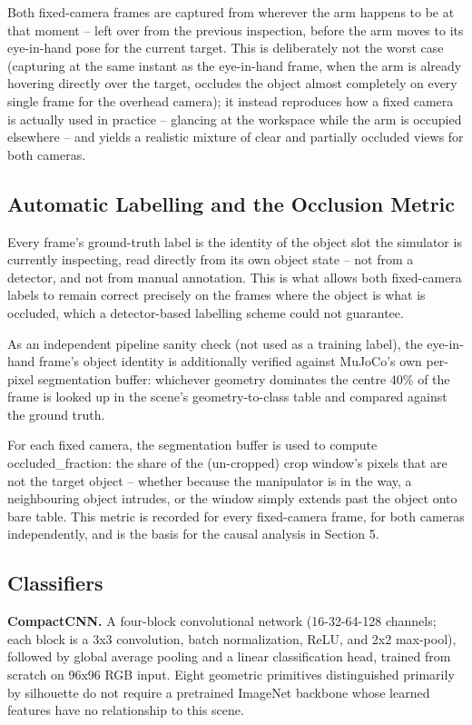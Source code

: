 \documentclass[conference]{IEEEtran}
\begin{document}
Both fixed-camera frames are captured from wherever the arm happens to be at that moment -- left over from the previous inspection, before the arm moves to its eye-in-hand pose for the current target. This is deliberately not the worst case (capturing at the same instant as the eye-in-hand frame, when the arm is already hovering directly over the target, occludes the object almost completely on every single frame for the overhead camera); it instead reproduces how a fixed camera is actually used in practice -- glancing at the workspace while the arm is occupied elsewhere -- and yields a realistic mixture of clear and partially occluded views for both cameras.

\subsection{Automatic Labelling and the Occlusion Metric}

Every frame's ground-truth label is the identity of the object slot the simulator is currently inspecting, read directly from its own object state -- not from a detector, and not from manual annotation. This is what allows both fixed-camera labels to remain correct precisely on the frames where the object is what is occluded, which a detector-based labelling scheme could not guarantee.

As an independent pipeline sanity check (not used as a training label), the eye-in-hand frame's object identity is additionally verified against MuJoCo's own per-pixel segmentation buffer: whichever geometry dominates the centre 40\% of the frame is looked up in the scene's geometry-to-class table and compared against the ground truth.

For each fixed camera, the segmentation buffer is used to compute occluded\_fraction: the share of the (un-cropped) crop window's pixels that are not the target object -- whether because the manipulator is in the way, a neighbouring object intrudes, or the window simply extends past the object onto bare table. This metric is recorded for every fixed-camera frame, for both cameras independently, and is the basis for the causal analysis in Section 5.

\subsection{Classifiers}

\textbf{CompactCNN.} A four-block convolutional network (16-32-64-128 channels; each block is a 3x3 convolution, batch normalization, ReLU, and 2x2 max-pool), followed by global average pooling and a linear classification head, trained from scratch on 96x96 RGB input. Eight geometric primitives distinguished primarily by silhouette do not require a pretrained ImageNet backbone whose learned features have no relationship to this scene.
\end{document}
